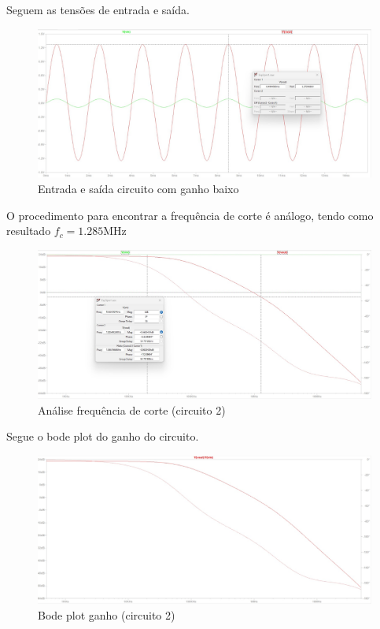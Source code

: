 \documentclass[10pt,twocolumn,letterpaper]{article}
\begin{document}
Seguem as tensões de entrada e saída.

\begin{figure}[h]
\caption{Entrada e saída circuito com ganho baixo}
\begin{center}
\includegraphics[scale=0.15]{figuras/fig7}
\end{center}
\end{figure}


O procedimento para encontrar a frequência de corte é análogo, tendo como resultado $f_c= 1.285$MHz

\begin{figure}[h]
\caption{Análise frequência de corte (circuito 2)}
\begin{center}
\includegraphics[scale=0.15]{figuras/fig8}
\end{center}
\end{figure}

\newpage
Segue o bode plot do ganho do circuito.

\begin{figure}[h]
\caption{Bode plot ganho (circuito 2)}
\begin{center}
\includegraphics[scale=0.15]{figuras/fig9}
\end{center}
\end{figure}
\end{document}

